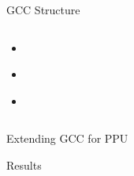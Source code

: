 \documentclass[10pt,aspectratio=169]{beamer}
\begin{document}
\begin{frame}[fragile]{GCC Structure}
    \begin{columns}[c]
    \begin{column}{0.5\textwidth}
        \begin{itemize}
            \item \begin{center}\end{center}
            \item \begin{center}\end{center}
            \item \begin{center}\end{center}
        \end{itemize}
    \end{column}

    \begin{column}{0.5\textwidth}
        \centering
        \begin{figure}
                \begin{adjustbox}{center, max width={.5\columnwidth}}
                    
                    
                \end{adjustbox}
        \end{figure}
    \end{column}
    \end{columns}
\end{frame}

\begin{frame}{Extending GCC for PPU}
 \begin{center}
 \end{center}
\end{frame}

\begin{frame}{Results}
 \begin{center}
 \end{center}
\end{frame}
\end{document}
